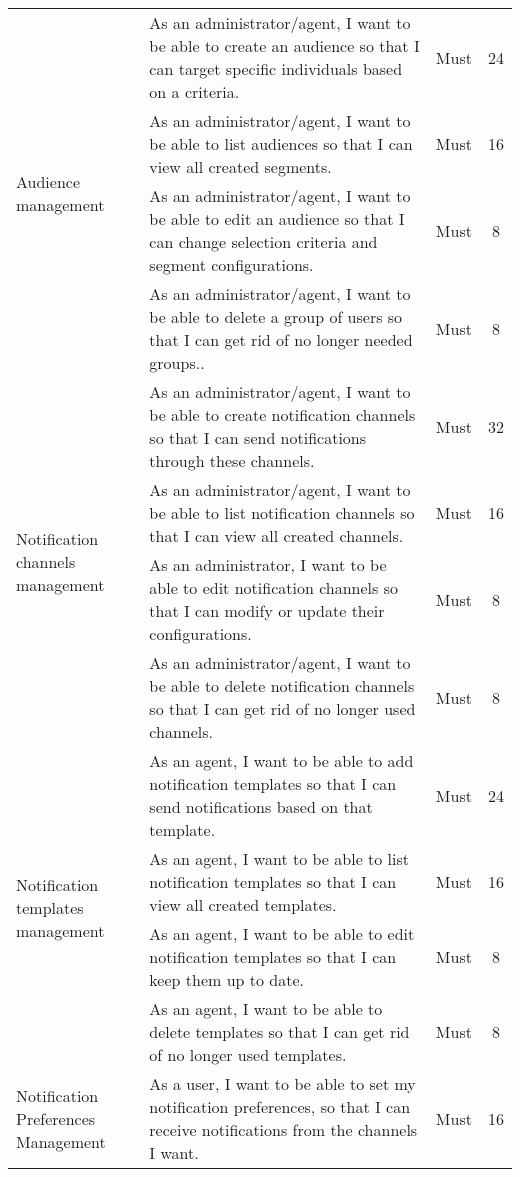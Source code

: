 \begin{longtable}{ | m{}  | m{} | c | c | }
        \hline
        \multirow{4}{5em}{Audience management} & As an administrator/agent, I want to be able to create an audience so that I can target specific individuals based on a criteria. & Must & 24 \\
        \cline{2-4}
        & As an administrator/agent, I want to be able to list audiences so that I can view all created segments. & Must & 16 \\
        \cline{2-4}
        & As an administrator/agent, I want to be able to edit an audience so that I can change selection criteria and segment configurations. & Must & 8 \\
        \cline{2-4}
        & As an administrator/agent, I want to be able to delete a group of users so that I can get rid of no longer needed groups.. & Must & 8 \\
        \hline
        \multirow{4}{5em}{Notification channels management} & As an administrator/agent, I want to be able to create notification channels so that I can send notifications through these channels. & Must & 32 \\
        \cline{2-4}
        & As an administrator/agent, I want to be able to list notification channels so that I can view all created channels. & Must & 16 \\
        \cline{2-4}
        & As an administrator, I want to be able to edit notification channels so that I can modify or update their configurations. & Must & 8 \\
        \cline{2-4}
        & As an administrator/agent, I want to be able to delete notification channels so that I can get rid of no longer used channels. & Must & 8 \\
        \hline
        \multirow{4}{5em}{Notification templates management} & As an agent, I want to be able to add notification templates so that I can send notifications based on that template. & Must & 24 \\
        \cline{2-4}
        & As an agent, I want to be able to list notification templates so that I can view all created templates. & Must & 16 \\
        \cline{2-4}
        & As an agent, I want to be able to edit notification templates so that I can keep them up to date. & Must & 8 \\
        \cline{2-4}
        & As an agent, I want to be able to delete templates so that I can get rid of no longer used templates. & Must & 8 \\
        \hline
        Notification Preferences Management & As a user, I want to be able to set my notification preferences, so that I can receive notifications from the channels I want. & Must & 16 \\

\end{longtable}
